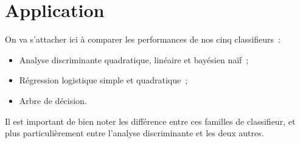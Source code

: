 \documentclass[a4paper,10pt]{report}
\begin{document}
\chapter{Application}



On va s'attacher ici à comparer les performances de nos cinq classifieurs~:
\begin{itemize}
	\item Analyse discriminante quadratique, linéaire et bayésien naïf~;
	\item Régression logistique simple et quadratique~;
	\item Arbre de décision.
\end{itemize}

Il est important de bien noter les différence entre ces familles de classifieur, et plus particulièrement entre l'analyse discriminante et les deux autres.\\
\end{document}
